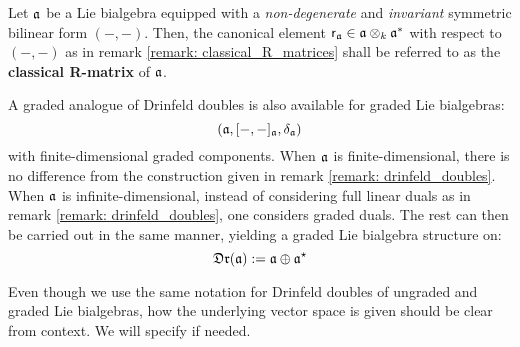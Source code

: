         \begin{definition} \label{def: classical_R_matrices}
            Let $\mathfrak{a}$ be a Lie bialgebra equipped with a \textit{non-degenerate} and \textit{invariant} symmetric bilinear form $(-, -)$. Then, the canonical element $\sfr_{\a} \in \a \tensor_k \a^*$ with respect to $(-, -)$ as in remark \ref{remark: classical_R_matrices} shall be referred to as the \textbf{classical R-matrix} of $\mathfrak{a}$.
        \end{definition}
        \begin{definition} \label{def: (quasi)_triangular_lie_bialgebras}
        \end{definition}
        \begin{remark} \label{remark: graded_drinfeld_doubles}
            A graded analogue of Drinfeld doubles is also available for graded Lie bialgebras:
                $$(\mathfrak{a}, [-, -]_{\mathfrak{a}}, \delta_{\mathfrak{a}})$$
            with finite-dimensional graded components. When $\mathfrak{a}$ is finite-dimensional, there is no difference from the construction given in remark \ref{remark: drinfeld_doubles}. When $\mathfrak{a}$ is infinite-dimensional, instead of considering full linear duals as in remark \ref{remark: drinfeld_doubles}, one considers graded duals. The rest can then be carried out in the same manner, yielding a graded Lie bialgebra structure on:
                $$\mathfrak{Dr}(\mathfrak{a}) := \mathfrak{a} \oplus \mathfrak{a}^{\star}$$
        \end{remark}
        Even though we use the same notation for Drinfeld doubles of ungraded and graded Lie bialgebras, how the underlying vector space is given should be clear from context. We will specify if needed.
        
